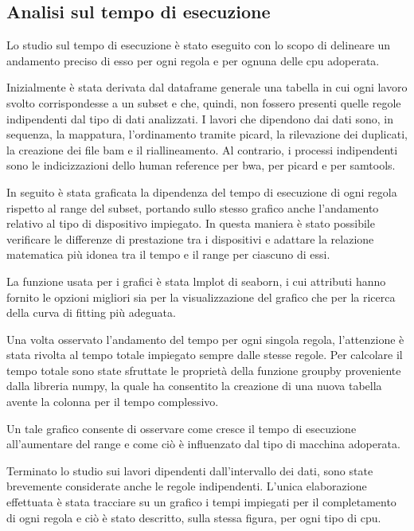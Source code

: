 \subsection{Analisi sul tempo di esecuzione}
\label{sbsec:Te}
Lo studio sul tempo di esecuzione è stato eseguito con lo scopo di delineare un andamento preciso di esso per ogni regola e per ognuna delle cpu adoperata.  

Inizialmente è stata derivata dal dataframe generale una tabella in cui ogni lavoro svolto corrispondesse a un subset e che, quindi, non fossero presenti quelle regole indipendenti dal tipo di dati analizzati.
I lavori che dipendono dai dati sono, in sequenza, la mappatura, l'ordinamento tramite picard, la rilevazione dei duplicati, la creazione dei file bam e il riallineamento.
Al contrario, i processi indipendenti sono le indicizzazioni dello human reference per bwa, per picard e per samtools. 

In seguito è stata graficata la dipendenza del tempo di esecuzione di ogni regola rispetto al range del subset, portando sullo stesso grafico anche l'andamento relativo al tipo di dispositivo impiegato. 
In questa maniera è stato possibile verificare le differenze di prestazione tra i dispositivi e adattare la relazione matematica più idonea tra il tempo e il range per ciascuno di essi.

La funzione usata per i grafici è stata lmplot di seaborn, i cui attributi hanno fornito le opzioni migliori sia per la visualizzazione del grafico che per la ricerca della curva di fitting più adeguata.

Una volta osservato l'andamento del tempo per ogni singola regola, l'attenzione è stata rivolta al tempo totale impiegato sempre dalle stesse regole.
Per calcolare il tempo totale sono state sfruttate le proprietà della funzione groupby proveniente dalla libreria numpy, la quale ha consentito la creazione di una nuova tabella avente la colonna per il tempo complessivo.

Un tale grafico consente di osservare come cresce il tempo di esecuzione all'aumentare del range e come ciò è influenzato dal tipo di macchina adoperata.

Terminato lo studio sui lavori dipendenti dall'intervallo dei dati, sono state brevemente considerate anche le regole indipendenti.
L'unica elaborazione effettuata è stata tracciare su un grafico i tempi impiegati per il completamento di ogni regola e ciò è stato descritto, sulla stessa figura, per ogni tipo di cpu.

